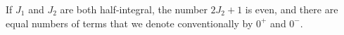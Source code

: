 If $J_1$ and $J_2$ are both half-integral, the number $2J_2+1$ is even, and there are equal numbers of terms that we denote conventionally by $0^+$ and $0^-$.

